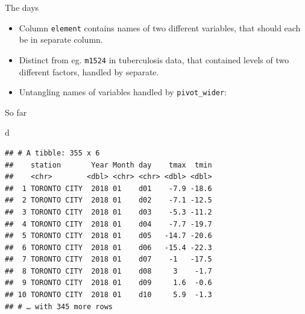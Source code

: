 \documentclass[ignorenonframetext,]{beamer}
\newenvironment{Shaded}{\begin{snugshade}}{\end{snugshade}}
\newcommand{\DataTypeTok}[1]{\textcolor[rgb]{0.13,0.29,0.53}{#1}}
\newcommand{\KeywordTok}[1]{\textcolor[rgb]{0.13,0.29,0.53}{\textbf{#1}}}
\newcommand{\NormalTok}[1]{#1}
\newcommand{\OperatorTok}[1]{\textcolor[rgb]{0.81,0.36,0.00}{\textbf{#1}}}
\newcommand{\StringTok}[1]{\textcolor[rgb]{0.31,0.60,0.02}{#1}}
\providecommand{\tightlist}{%
  \setlength{\itemsep}{0pt}\setlength{\parskip}{0pt}}
\begin{document}
\begin{frame}[fragile]{The days}
\protect\hypertarget{the-days}{}

\begin{itemize}
\tightlist
\item
  Column \texttt{element} contains names of two different variables,
  that should each be in separate column.
\item
  Distinct from eg. \texttt{m1524} in tuberculosis data, that contained
  levels of two different factors, handled by separate.
\item
  Untangling names of variables handled by \texttt{pivot\_wider}:
\end{itemize}

\begin{Shaded}
\end{Shaded}

\end{frame}

\begin{frame}[fragile]{So far}
\protect\hypertarget{so-far-1}{}

\begin{Shaded}
\begin{Highlighting}[]
\NormalTok{d}
\end{Highlighting}
\end{Shaded}

\begin{verbatim}
## # A tibble: 355 x 6
##    station       Year Month day    tmax  tmin
##    <chr>        <dbl> <chr> <chr> <dbl> <dbl>
##  1 TORONTO CITY  2018 01    d01    -7.9 -18.6
##  2 TORONTO CITY  2018 01    d02    -7.1 -12.5
##  3 TORONTO CITY  2018 01    d03    -5.3 -11.2
##  4 TORONTO CITY  2018 01    d04    -7.7 -19.7
##  5 TORONTO CITY  2018 01    d05   -14.7 -20.6
##  6 TORONTO CITY  2018 01    d06   -15.4 -22.3
##  7 TORONTO CITY  2018 01    d07    -1   -17.5
##  8 TORONTO CITY  2018 01    d08     3    -1.7
##  9 TORONTO CITY  2018 01    d09     1.6  -0.6
## 10 TORONTO CITY  2018 01    d10     5.9  -1.3
## # … with 345 more rows
\end{verbatim}

\end{frame}
\end{document}
